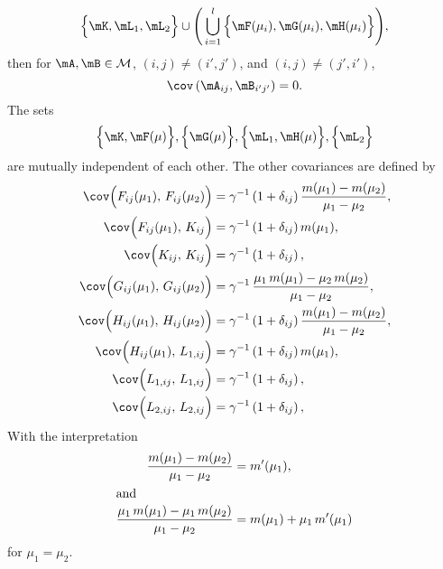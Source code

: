 \begin{lemma}
\[        \Big\{ \mK, \mL_1, \mL_2 \Big\}
        \cup
        \Bigg(
        \bigcup_{i=1}^l
            \Big\{ 
                \mF(\mu_i), \mG(\mu_i), \mH(\mu_i)
            \Big\}
        \Bigg),
    \] 
    then for $\mA, \mB \in \mathcal{M}$, $(i,j) \neq (i',j')$, and 
    $(i,j) \neq (j',i')$,
    \[
        \cov\left( \mA_{ij}, \mB_{i'j'} \right)
        =
        0.
    \]
    The sets
    \[
        \Big\{ \mK, \mF( \mu ) \Big\},
        \Big\{ \mG( \mu) \Big\},
        \Big\{ \mL_1, \mH( \mu )\Big\},
        \Big\{ \mL_2 \Big\}
    \]
    are mutually independent of each other.
    The other covariances are defined by
    \begin{align*}
        \cov\Big( F_{ij}(\mu_1), \, F_{ij}(\mu_2) \Big)
            &= \gamma^{-1}
               \left( 1 + \delta_{ij} \right)
               \frac{ m(\mu_1) - m(\mu_2) }
                    { \mu_1 - \mu_2 }, \\
        \cov\Big( F_{ij}(\mu_1), \, K_{ij} \Big)
            &= \gamma^{-1}
               \left( 1 + \delta_{ij} \right) m(\mu_1), \\
        \cov\Big( K_{ij}, \, K_{ij} \Big)
            &= \gamma^{-1}
               \left( 1 + \delta_{ij} \right), \\
        \cov\Big( G_{ij}(\mu_1), \, G_{ij}(\mu_2) \Big)
            &= \gamma^{-1} \,
               \frac{ \mu_1 \, m(\mu_1) - \mu_2 \, m(\mu_2) }
                    { \mu_1 - \mu_2 }, \\
        \cov\Big( H_{ij}(\mu_1), \, H_{ij}(\mu_2) \Big)
            &= \gamma^{-1}
               \left( 1 + \delta_{ij} \right)
               \frac{ m(\mu_1) - m(\mu_2) }
                    { \mu_1 - \mu_2 }, \\
        \cov\Big( H_{ij}(\mu_1), \, L_{1,ij} \Big)
            &= \gamma^{-1}
               \left( 1 + \delta_{ij} \right) m(\mu_1), \\
        \cov\Big( L_{1,ij}, \, L_{1,ij} \Big)
            &= \gamma^{-1}
               \left( 1 + \delta_{ij} \right), \\
        \cov\Big( L_{2,ij}, \, L_{2,ij} \Big)
            &= \gamma^{-1}
               \left( 1 + \delta_{ij} \right),
    \end{align*}
    With the interpretation
    \begin{align*}
        \frac{ m(\mu_1) - m(\mu_2) }
             { \mu_1 - \mu_2 }
            &=
                m'(\mu_1), \\
    \intertext{and}
        \frac{ \mu_1 \, m(\mu_1) - \mu_1 \, m(\mu_2) }
             { \mu_1 - \mu_2 }
            &= m( \mu_1 ) + \mu_1 \, m'(\mu_1)
    \end{align*}
    for $\mu_1 = \mu_2$.
\end{lemma}
